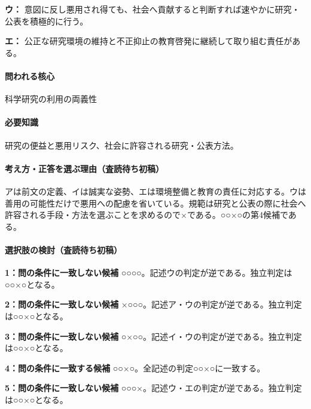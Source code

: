 \noindent\textbf{ウ：} 意図に反し悪用され得ても、社会へ貢献すると判断すれば速やかに研究・公表を積極的に行う。\par

\noindent\textbf{エ：} 公正な研究環境の維持と不正抑止の教育啓発に継続して取り組む責任がある。\par

\paragraph{問われる核心} 科学研究の利用の両義性

\paragraph{必要知識} 研究の便益と悪用リスク、社会に許容される研究・公表方法。

\paragraph{考え方・正答を選ぶ理由（査読待ち初稿）} アは前文の定義、イは誠実な姿勢、エは環境整備と教育の責任に対応する。ウは善用の可能性だけで悪用への配慮を省いている。規範は研究と公表の際に社会へ許容される手段・方法を選ぶことを求めるので×である。○○×○の第4候補である。

\paragraph{選択肢の検討（査読待ち初稿）}\mbox{}\par

\noindent\textbf{1：問の条件に一致しない候補} ○○○○。記述ウの判定が逆である。独立判定は○○×○となる。\par

\noindent\textbf{2：問の条件に一致しない候補} ×○○○。記述ア・ウの判定が逆である。独立判定は○○×○となる。\par

\noindent\textbf{3：問の条件に一致しない候補} ○×○○。記述イ・ウの判定が逆である。独立判定は○○×○となる。\par

\noindent\textbf{4：問の条件に一致する候補} ○○×○。全記述の判定○○×○に一致する。\par

\noindent\textbf{5：問の条件に一致しない候補} ○○○×。記述ウ・エの判定が逆である。独立判定は○○×○となる。\par

